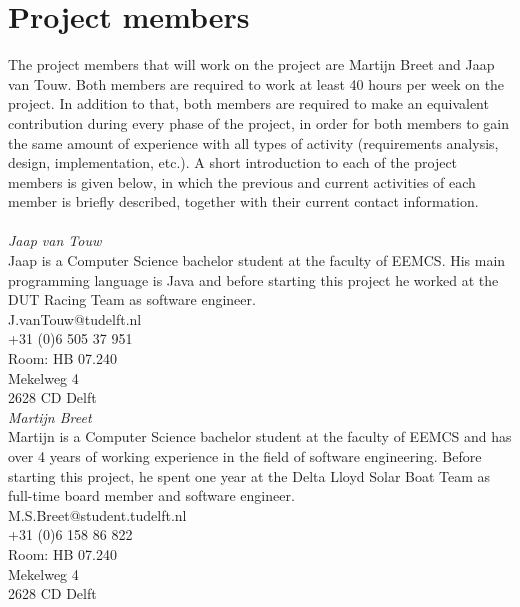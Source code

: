 \section{Project members}
The project members that will work on the project are Martijn Breet and Jaap van Touw. Both members are required to work at least 40 hours per week on the project. In addition to that, both members are required to make an equivalent contribution during every phase of the project, in order for both members to gain the same amount of experience with all types of activity (requirements analysis, design, implementation, etc.). A short introduction to each of the project members is given below, in which the previous and current activities of each member is briefly described, together with their current contact information.\\
\noindent\\
\textit{Jaap van Touw}\\
Jaap is a Computer Science bachelor student at the faculty of EEMCS. His main programming language is Java and before starting this project he worked at the DUT Racing Team as software engineer.\\

\noindent
J.vanTouw@tudelft.nl\\
+31 (0)6 505 37 951\\
Room: HB 07.240\\
Mekelweg 4\\
2628 CD Delft\\

\noindent
\textit{Martijn Breet}\\
Martijn is a Computer Science bachelor student at the faculty of EEMCS and has over 4 years of working experience in the field of software engineering.  Before starting this project, he spent one year at the Delta Lloyd Solar Boat Team as full-time board member and software engineer.\\

\noindent
M.S.Breet@student.tudelft.nl \\
+31 (0)6 158 86 822\\
Room: HB 07.240\\
Mekelweg 4\\
2628 CD Delft\\